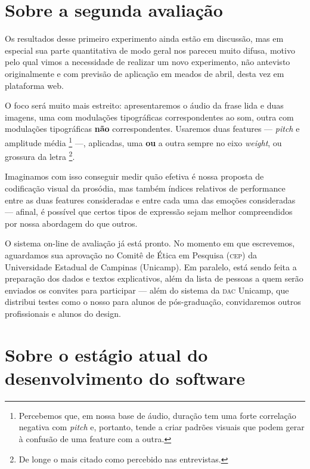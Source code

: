 \documentclass[a4paper,11pt,titlepage,singlespacing]{article}
\let\svthefootnote\thefootnote
\newcommand\Cfootnote[2][black]{\def\thefootnote{\color{#1}\svthefootnote}%
  \footnote{\color{#1}#2}}
\begin{document}
{    \section{Sobre a segunda avaliação}
    \label{sec:n_avaliacao_2}

    Os resultados desse primeiro experimento ainda estão em discussão, mas em especial sua parte quantitativa de modo geral nos pareceu muito difusa, motivo pelo qual vimos a necessidade de realizar um novo experimento, não antevisto originalmente e com previsão de aplicação em meados de abril, desta vez em plataforma web. 
    
    O foco será muito mais estreito: apresentaremos o áudio da frase lida e duas imagens, uma com modulações tipográficas correspondentes ao som, outra com modulações tipográficas \textbf{não} correspondentes. Usaremos duas features — \textit{pitch} e amplitude média\Cfootnote[pos_parecer]{Percebemos que, em nossa base de áudio, duração tem uma forte correlação negativa com \textit{pitch} e, portanto, tende a criar padrões visuais que podem gerar à confusão de uma feature com a outra.} —, aplicadas, uma \textbf{ou} a outra sempre no eixo \textit{weight}, ou grossura da letra\Cfootnote[pos_parecer]{De longe o mais citado como percebido nas entrevistas.}. 
    
    Imaginamos com isso conseguir medir quão efetiva é nossa proposta de codificação visual da prosódia, mas também índices relativos de performance entre as duas features consideradas e entre cada uma das emoções consideradas — afinal, é possível que certos tipos de expressão sejam melhor compreendidos por nossa abordagem do que outros.
    
    O sistema on-line de avaliação já está pronto. No momento em que escrevemos, aguardamos sua aprovação no Comitê de Ética em Pesquisa (\textsc{cep}) da Universidade Estadual de Campinas (Unicamp). Em paralelo, está sendo feita a preparação dos dados e textos explicativos, além da lista de pessoas a quem serão enviados os convites para participar — além do sistema da \textsc{dac} Unicamp, que distribui testes como o nosso para alunos de pós-graduação, convidaremos outros profissionais e alunos do design.



    \section{Sobre o estágio atual do desenvolvimento do software}
    \label{sec:n_estagio_atual_software}
    
}
\end{document}
